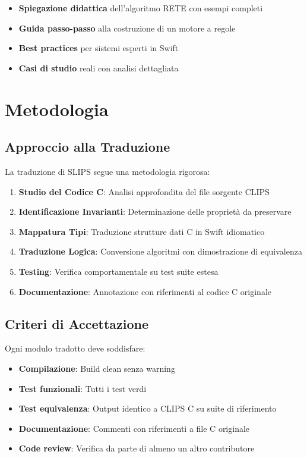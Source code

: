 \begin{itemize}
\item \textbf{Spiegazione didattica} dell'algoritmo RETE con esempi completi
\item \textbf{Guida passo-passo} alla costruzione di un motore a regole
\item \textbf{Best practices} per sistemi esperti in Swift
\item \textbf{Casi di studio} reali con analisi dettagliata
\end{itemize}

\section{Metodologia}

\subsection{Approccio alla Traduzione}

La traduzione di SLIPS segue una metodologia rigorosa:

\begin{enumerate}
\item \textbf{Studio del Codice C}: Analisi approfondita del file sorgente CLIPS
\item \textbf{Identificazione Invarianti}: Determinazione delle proprietà da preservare
\item \textbf{Mappatura Tipi}: Traduzione strutture dati C in Swift idiomatico
\item \textbf{Traduzione Logica}: Conversione algoritmi con dimostrazione di equivalenza
\item \textbf{Testing}: Verifica comportamentale su test suite estesa
\item \textbf{Documentazione}: Annotazione con riferimenti al codice C originale
\end{enumerate}

\subsection{Criteri di Accettazione}

Ogni modulo tradotto deve soddisfare:

\begin{itemize}
\item \textbf{Compilazione}: Build clean senza warning
\item \textbf{Test funzionali}: Tutti i test verdi
\item \textbf{Test equivalenza}: Output identico a CLIPS C su suite di riferimento
\item \textbf{Documentazione}: Commenti con riferimenti a file C originale
\item \textbf{Code review}: Verifica da parte di almeno un altro contributore
\end{itemize}

